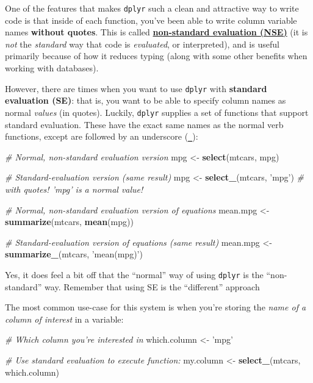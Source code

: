 \documentclass[]{book}
\newenvironment{Shaded}{\begin{snugshade}}{\end{snugshade}}
\newcommand{\KeywordTok}[1]{\textcolor[rgb]{0.13,0.29,0.53}{\textbf{#1}}}
\newcommand{\StringTok}[1]{\textcolor[rgb]{0.31,0.60,0.02}{#1}}
\newcommand{\CommentTok}[1]{\textcolor[rgb]{0.56,0.35,0.01}{\textit{#1}}}
\newcommand{\NormalTok}[1]{#1}
\theoremstyle{definition}
\theoremstyle{definition}
\theoremstyle{remark}
\begin{document}
One of the features that makes \texttt{dplyr} such a clean and
attractive way to write code is that inside of each function, you've
been able to write column variable names \textbf{without quotes}. This
is called
\href{https://cran.r-project.org/web/packages/dplyr/vignettes/nse.html}{\textbf{non-standard
evaluation (NSE)}} (it is \emph{not} the \emph{standard} way that code
is \emph{evaluated}, or interpreted), and is useful primarily because of
how it reduces typing (along with some other benefits when working with
databases).

However, there are times when you want to use \texttt{dplyr} with
\textbf{standard evaluation (SE)}: that is, you want to be able to
specify column names as normal \emph{values} (in quotes). Luckily,
\texttt{dplyr} supplies a set of functions that support standard
evaluation. These have the exact same names as the normal verb
functions, except are followed by an underscore (\textbf{\texttt{\_}}):

\begin{Shaded}
\begin{Highlighting}[]
\CommentTok{# Normal, non-standard evaluation version}
\NormalTok{mpg <-}\StringTok{ }\KeywordTok{select}\NormalTok{(mtcars, mpg)}

\CommentTok{# Standard-evaluation version (same result)}
\NormalTok{mpg <-}\StringTok{ }\KeywordTok{select_}\NormalTok{(mtcars, }\StringTok{'mpg'}\NormalTok{)  }\CommentTok{# with quotes! 'mpg' is a normal value!}

\CommentTok{# Normal, non-standard evaluation version of equations}
\NormalTok{mean.mpg <-}\StringTok{ }\KeywordTok{summarize}\NormalTok{(mtcars, }\KeywordTok{mean}\NormalTok{(mpg))}

\CommentTok{# Standard-evaluation version of equations (same result)}
\NormalTok{mean.mpg <-}\StringTok{ }\KeywordTok{summarize_}\NormalTok{(mtcars, }\StringTok{'mean(mpg)'}\NormalTok{)}
\end{Highlighting}
\end{Shaded}

Yes, it does feel a bit off that the ``normal'' way of using
\texttt{dplyr} is the ``non-standard'' way. Remember that using SE is
the ``different'' approach

The most common use-case for this system is when you're storing the
\emph{name of a column of interest} in a variable:

\begin{Shaded}
\begin{Highlighting}[]
\CommentTok{# Which column you're interested in}
\NormalTok{which.column <-}\StringTok{ 'mpg'}

\CommentTok{# Use standard evaluation to execute function:}
\NormalTok{my.column <-}\StringTok{ }\KeywordTok{select_}\NormalTok{(mtcars, which.column)}
\end{Highlighting}
\end{Shaded}
\end{document}
